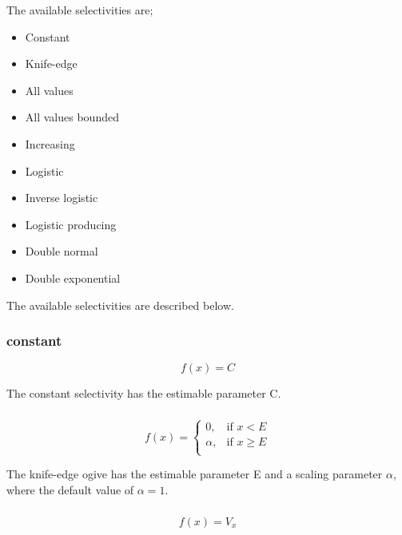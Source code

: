 The available selectivities are;

\begin{itemize}
  \item Constant
  \item Knife-edge
  \item All values
  \item All values bounded
  \item Increasing
  \item Logistic
  \item Inverse logistic
  \item Logistic producing
  \item Double normal
  \item Double exponential
\end{itemize}

The available selectivities are described below.

\subsubsection[Constant]{{constant}}

\begin{equation}
f(x)=C
\end{equation}

The constant selectivity has the estimable parameter C. 

\subsubsection[Knife-edge]{}
\begin{equation}
f(x)= \begin{cases}
  0, & \text{if $x < E$} \\
  \alpha, & \text{if $x \ge E$}\\ 
  \end{cases} 
\end{equation}

The knife-edge ogive has the estimable parameter E and a scaling parameter $\alpha$, where the default value of $\alpha = 1$.

\subsubsection[All-values]{}

\begin{equation}
f(x)=V_x
\end{equation}


